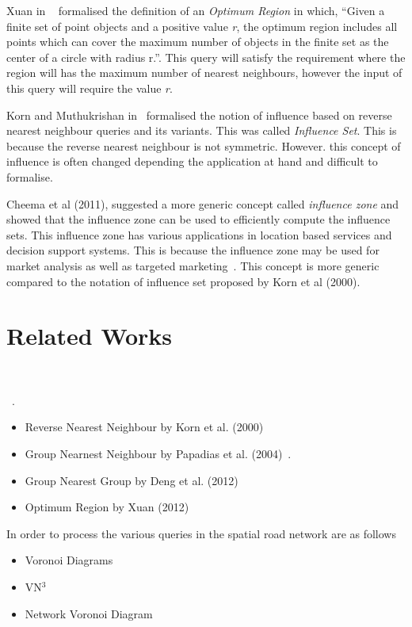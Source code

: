 \documentclass[a4paper,11pt]{article}
\begin{document}
Xuan in ~\cite{Xuan2012} formalised the definition of an \textit{Optimum Region} in which, ``Given a finite set of point objects and a positive value \textit{r}, the optimum region includes all points which can cover the maximum number of objects in the finite set as the center of a circle with radius r.''. This query will satisfy the requirement where the region will has the maximum number of nearest neighbours, however the input of this query will require the value \textit{r}.

Korn and Muthukrishan in~\cite{korn2000influence} formalised the notion of influence based on reverse nearest neighbour queries and its variants. This was called \textit{Influence Set}. This is because the reverse nearest neighbour is not symmetric. However. this concept of influence is often changed depending the application at hand and difficult to formalise. 

Cheema et al (2011), suggested a more generic concept called \textit{influence zone} and showed that the influence zone can be used to efficiently compute the influence sets. This influence zone has various applications in location based services and decision support systems. This is because the influence zone may be used for market analysis as well as targeted marketing~\cite{cheema2011influence}. This concept is more generic compared to the notation of influence set proposed by Korn et al (2000). 


\section{Related Works}

~\cite{guting1994introduction}

~\cite{berchtold1998fast}.

\begin{itemize}
	\item Reverse Nearest Neighbour by Korn et al. (2000)~\cite{korn2000influence}
	\item Group Nearnest Neighbour by Papadias et al. (2004)~\cite{papadias2004group}.
	\item Group Nearest Group by Deng et al. (2012)~\cite{deng2012group}
	\item Optimum Region by Xuan (2012)~\cite{Xuan2012}
\end{itemize}

In order to process the various queries in the spatial road network are as follows

\begin{itemize}
	\item Voronoi Diagrams 
	\item VN$^3$ ~\cite{kolahdouzan2004voronoi}
	\item Network Voronoi Diagram~\cite{xuan2009network}
\end{itemize}
\end{document}
